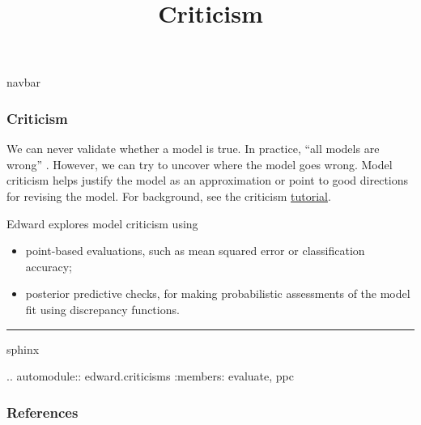 \title{Criticism}

{{navbar}}

\subsubsection{Criticism}

We can never validate whether a model is true. In practice, ``all
models are wrong'' \citep{box1976science}. However, we can try to
uncover where the model goes wrong. Model criticism helps justify the
model as an approximation or point to good directions for revising the
model.
For background, see the criticism \href{/tutorials/criticism}{tutorial}.

Edward explores model criticism using
\begin{itemize}
  \item point-based evaluations, such as mean squared error or
  classification accuracy;
  \item posterior predictive checks, for making probabilistic
  assessments of the model fit using discrepancy functions.
\end{itemize}





\begin{center}\rule{3in}{0.4pt}\end{center}

{{sphinx

.. automodule:: edward.criticisms
   :members: evaluate,
             ppc

}}

\subsubsection{References}\label{references}
